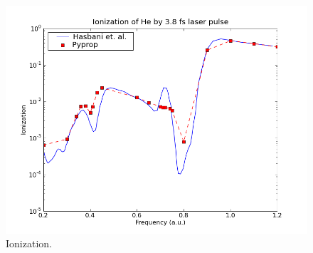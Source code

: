\documentclass[a4paper,12pt]{article}
\begin{document}
\begin{figure}[ht]
\begin{center}
	\includegraphics[width=\textwidth]{hasbani_pyprop2e_ionization.png}
\end{center}
\caption{Ionization.}
\end{figure}
\end{document}
